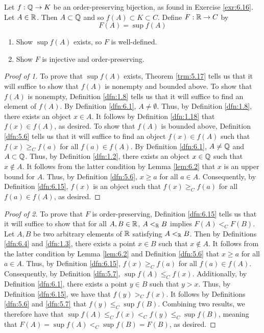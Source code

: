 \documentclass[../main.tex]{subfiles}
\begin{document}
\begin{exercise}\label{exr:6.17}
    Let $f:\mathbb{Q}\to K$ be an order-preserving bijection, as found in Exercise \ref{exr:6.16}. Let $A\in\mathbb{R}$. Then $A\subset\mathbb{Q}$ and so $f(A)\subset K\subset C$. Define $F:\mathbb{R}\to C$ by
    \begin{equation*}
        F(A)=\sup f(A)
    \end{equation*}
    \begin{enumerate}
        \item Show $\sup f(A)$ exists, so $F$ is well-defined.
        \item Show $F$ is injective and order-preserving.
    \end{enumerate}
    \begin{proof}[Proof of 1]
        To prove that $\sup f(A)$ exists, Theorem \ref{trm:5.17} tells us that it will suffice to show that $f(A)$ is nonempty and bounded above. To show that $f(A)$ is nonempty, Definition \ref{dfn:1.8} tells us that it will suffice to find an element of $f(A)$. By Definition \ref{dfn:6.1}, $A\neq\emptyset$. Thus, by Definition \ref{dfn:1.8}, there exists an object $x\in A$. It follows by Definition \ref{dfn:1.18} that $f(x)\in f(A)$, as desired. To show that $f(A)$ is bounded above, Definition \ref{dfn:5.6} tells us that it will suffice to find an object $f(x)\in f(A)$ such that $f(x)\geq_Cf(a)$ for all $f(a)\in f(A)$. By Definition \ref{dfn:6.1}, $A\neq\mathbb{Q}$ and $A\subset\mathbb{Q}$. Thus, by Definition \ref{dfn:1.2}, there exists an object $x\in\mathbb{Q}$ such that $x\notin A$. It follows from the latter condition by Lemma \ref{lem:6.2} that $x$ is an upper bound for $A$. Thus, by Definition \ref{dfn:5.6}, $x\geq a$ for all $a\in A$. Consequently, by Definition \ref{dfn:6.15}, $f(x)$ is an object such that $f(x)\geq_Cf(a)$ for all $f(a)\in f(A)$, as desired.
    \end{proof}
    \begin{proof}[Proof of 2]
        To prove that $F$ is order-preserving, Definition \ref{dfn:6.15} tells us that it will suffice to show that for all $A,B\in\mathbb{R}$, $A<_{\mathbb{R}} B$ implies $F(A)<_CF(B)$. Let $A,B$ be two arbitrary elements of $\mathbb{R}$ satisfying $A<_{\mathbb{R}} B$. Then by Definitions \ref{dfn:6.4} and \ref{dfn:1.3}, there exists a point $x\in B$ such that $x\notin A$. It follows from the latter condition by Lemma \ref{lem:6.2} and Definition \ref{dfn:5.6} that $x\geq a$ for all $a\in A$. Thus, by Definition \ref{dfn:6.15}, $f(x)\geq_Cf(a)$ for all $f(a)\in f(A)$. Consequently, by Definition \ref{dfn:5.7}, $\sup f(A)\leq_Cf(x)$. Additionally, by Definition \ref{dfn:6.1}, there exists a point $y\in B$ such that $y>x$. Thus, by Definition \ref{dfn:6.15}, we have that $f(y)>_Cf(x)$. It follows by Definitions \ref{dfn:5.6} and \ref{dfn:5.7} that $f(y)\leq_C\sup f(B)$. Combining two results, we therefore have that $\sup f(A)\leq_C f(x)<_Cf(y)\leq_C\sup f(B)$, meaning that $F(A)=\sup f(A)<_C\sup f(B)=F(B)$, as desired.\par

\end{proof}
\end{exercise}
\end{document}

